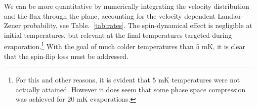 \documentclass[%
 reprint,
 amsmath,amssymb,
 aps,
prl,
]{revtex4-1}
\begin{document}
We can be more quantitative by numerically integrating the velocity distribution and the flux through the plane, accounting for the velocity dependent Landau-Zener probability, see Table.~\ref{tab:rates}. The spin-dynamical effect is negligible at initial temperatures, but relevant at the final temperatures targeted during evaporation.\footnote{For this and other reasons, it is evident that $5\text{ mK}$ temperatures were not actually attained. However it does seem that some phase space compression was achieved for $20\text{ mK}$ evaporations.} With the goal of much colder temperatures than $5\text{ mK}$, it is clear that the spin-flip loss must be addressed. 



\end{document}
